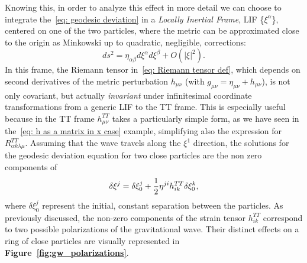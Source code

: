Knowing this, in order to analyze this effect in more detail we can choose to integrate the~\eqref{eq: geodesic deviation} in a \textit{Locally Inertial Frame}, LIF \{$\xi^\alpha$\}, centered on one of the two particles, where the metric can be approximated close to the origin as Minkowski up to quadratic, negligible, corrections:
\[
    ds^2 = \eta_{\alpha\beta} d\xi^\alpha d\xi^\beta + O(|\xi|^2).
\]
In this frame, the Riemann tensor in~\eqref{eq: Riemann tensor def}, which depends on second derivatives of the metric perturbation $h_{\mu\nu}$ (with $g_{\mu\nu} = \eta_{\mu\nu} + h_{\mu\nu}$), is not only covariant, but actually \textit{invariant} under infinitesimal coordinate transformations from a generic LIF to the TT frame. 
This is especially useful because in the TT frame $h^{TT}_{\mu\nu}$ takes a particularly simple form, as we have seen in the~\eqref{eq: h as a matrix in x case} example, simplifying also the expression for $R^{TT}_{\alpha k \lambda \mu}$. 
Assuming that the wave travels along the $\xi^1$ direction, the solutions for the geodesic deviation equation for two close particles are the non zero components of 
\begin{equation}
    \delta\xi^j = \delta\xi_0^j + \frac{1}{2}\eta^{ji} h^{TT}_{ik} \delta\xi_0^k,
    \notag
\end{equation}
where $\delta\xi_0^j$ represent the initial, constant separation between the particles. 
As previously discussed, the non-zero components of the strain tensor $h_{ik}^{TT}$ correspond to two possible polarizations of the gravitational wave. 
Their distinct effects on a ring of close particles are visually represented in \textbf{Figure~\ref{fig:gw_polarizations}}.
